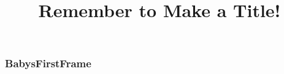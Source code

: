 \documentclass[12pt, aspectratio=169, svgnames, xetex, rgb]{beamer}
\title{Remember to Make a Title!}
\date{}
\begin{document}
\begin{frame}
\maketitle
\end{frame}








\begin{frame}\frametitle{BabysFirstFrame}
    
\end{frame}
\end{document}
